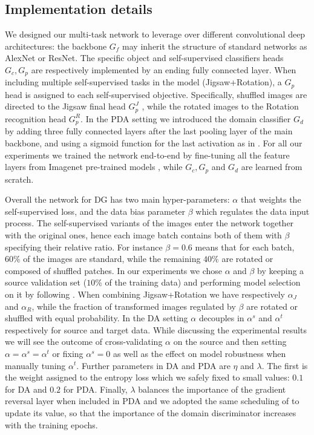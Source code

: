 \subsection{Implementation details}
\label{subsec:implementation}
We designed our multi-task network to leverage over different convolutional deep architectures: the backbone $G_f$ may inherit the structure of standard networks as AlexNet or ResNet.  
The specific object and self-supervised classifiers heads $G_c,G_p$ are respectively implemented by an ending fully connected layer.
{When including  multiple self-supervised tasks in the model (\ie Jigsaw+Rotation), a $G_p$ head is assigned to each self-supervised objective. Specifically, shuffled images are directed to the Jigsaw final head $G_p^J$ , while the rotated images to the Rotation recognition head $G_p^R$.}
In the PDA setting we introduced the domain classifier $G_d$ by adding three fully connected layers after the last pooling layer of the main backbone, and using a sigmoid function for the last activation as in \cite{Ganin:DANN:JMLR16}. For all our experiments we trained the network end-to-end by fine-tuning all the feature layers from Imagenet pre-trained models \cite{imagenet}, while $G_c, G_p$ and $G_d$ are learned from scratch. 

Overall the network for DG has two main hyper-parameters: $\alpha$ that weights the self-supervised loss, and the data bias parameter $\beta$ which regulates the data input process. The self-supervised variants of the images enter the network together with the original ones, hence each image batch contains both of them with $\beta$ specifying their relative ratio. For instance $\beta=0.6$ means that for each batch, $60\%$ of the images are standard, while the remaining $40\%$ are rotated or composed of shuffled patches. {In our experiments we chose $\alpha$ and $\beta$ by keeping a source validation set ($10\%$ of the training data) and performing model selection on it by following \cite{anonymous2021in}. 
When combining Jigsaw+Rotation we have respectively $\alpha_J$ and $\alpha_R$, while the fraction of transformed images regulated by $\beta$ are rotated or shuffled with equal probability.
In the DA setting $\alpha$ decouples in $\alpha^s$ and  $\alpha^t$ respectively for source and target data. While discussing the experimental results we will see the outcome of cross-validating $\alpha$ on the source and then setting $\alpha=\alpha^s=\alpha^t$ or fixing $\alpha^s=0$ as well as the effect on model robustness when manually tuning $\alpha^t$. 
Further parameters in DA and PDA are $\eta$ and  $\lambda$. The first is the weight assigned to the entropy loss which we safely fixed to small values: $0.1$ for DA and $0.2$ for PDA. Finally, $\lambda$ balances the importance of the gradient reversal layer when included in PDA and we adopted the same scheduling of \cite{Ganin:DANN:JMLR16} to update its value, so that the importance of the domain discriminator increases with the training epochs.}

